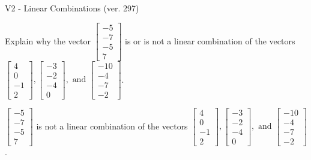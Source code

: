 \begin{exercise}
  \begin{exerciseTitle}V2 - Linear Combinations (ver. 297)\end{exerciseTitle}
  \begin{exerciseStatement}
    Explain why the vector \(\left[\begin{array}{c}
-5 \\
-7 \\
-5 \\
7
\end{array}\right]\)  is or is not a linear 
	combination of the vectors \(\left[\begin{array}{c}
4 \\
0 \\
-1 \\
2
\end{array}\right] , \left[\begin{array}{c}
-3 \\
-2 \\
-4 \\
0
\end{array}\right] , \text{ and } \left[\begin{array}{c}
-10 \\
-4 \\
-7 \\
-2
\end{array}\right]\).
	


  \end{exerciseStatement}
  \begin{exerciseAnswer}
   \(\left[\begin{array}{c}
-5 \\
-7 \\
-5 \\
7
\end{array}\right]\) 
  	 is not  
	a linear combination of the vectors \(\left[\begin{array}{c}
4 \\
0 \\
-1 \\
2
\end{array}\right] , \left[\begin{array}{c}
-3 \\
-2 \\
-4 \\
0
\end{array}\right] , \text{ and } \left[\begin{array}{c}
-10 \\
-4 \\
-7 \\
-2
\end{array}\right]\).

	
  


  \end{exerciseAnswer}
\end{exercise}